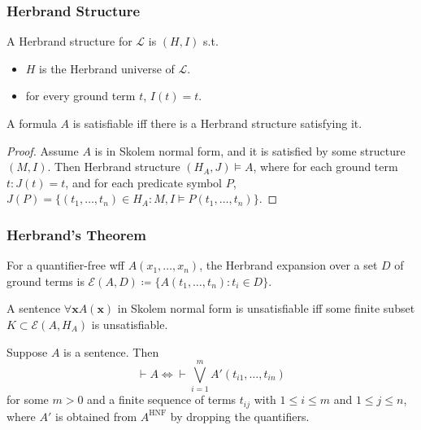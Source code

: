 \documentclass[UTF8,11pt,colorlinks,compress,openany]{beamer}%
\begin{document}
\begin{frame}\frametitle{Herbrand Structure}
\begin{definition}
A Herbrand structure for $\mathscr{L}$ is $(H,I)$ s.t.
\begin{itemize}
	\item $H$ is the Herbrand universe of $\mathscr{L}$.
	\item for every ground term $t$, $I(t)=t$.
\end{itemize}
\end{definition}
\begin{theorem}
A formula $A$ is satisfiable iff there is a Herbrand structure satisfying it.
\end{theorem}
\begin{proof}
Assume $A$ is in Skolem normal form, and it is satisfied by some structure $(M,I)$. Then Herbrand structure $(H_A,J)\vDash A$, where for each ground term $t: J(t)=t$, and for each predicate symbol $P$, $J(P)=\big\{(t_1,\dots,t_n)\in H_A: M,I\vDash P(t_1,\dots,t_n)\big\}$.
\end{proof}
\end{frame}

\begin{frame}\frametitle{Herbrand's Theorem}
For a quantifier-free wff $A(x_1,\dots,x_n)$, the Herbrand expansion over a set $D$ of ground terms is $\mathcal{E}(A,D)\coloneqq \big\{A(t_1,\dots,t_n): t_i\in D\big\}$.
\begin{theorem}
A sentence $\forall\mathbf{x} A(\mathbf{x})$ in Skolem normal form is unsatisfiable iff some finite subset $K\subset\mathcal{E}(A,H_A)$ is unsatisfiable.
\end{theorem}
	\begin{theorem}
		Suppose $A$ is a sentence. Then
		\[\vdash A\iff\vdash\bigvee\limits_{i=1}^m A'(t_{i1},\dots,t_{in})\]
		for some $m>0$ and a finite sequence of terms $t_{ij}$ with $1\leq i\leq m$ and $1\leq j\leq n$, where $A'$ is obtained from $A^{\mathrm{HNF}}$ by dropping the quantifiers.
	\end{theorem}
\end{frame}
\end{document}
